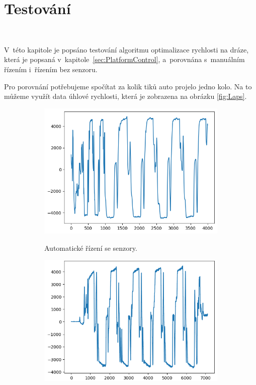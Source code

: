 \chapter{Testování}
\label{sec:Testing}\

V~této kapitole je popsáno testování algoritmu optimalizace rychlosti na dráze,
která je popsaná v~kapitole~\ref{sec:PlatformControl}, a~porovnána s~manuálním
řízením i~řízením bez senzoru.

Pro porovnání potřebujeme spočítat za kolik tiků auto projelo jedno kolo. 
Na to můžeme využít data úhlové rychlosti, která je zobrazena 
na obrázku \ref{fig:Laps}.

\begin{figure}[!h]
    \begin{subfigure}{.5\textwidth}
        \includegraphics[width = \textwidth]{Figures/LapAuto.png}
        \label{fig:LapsAuto}
        \caption{Automatické řízení se senzory.}
    \end{subfigure}
    \begin{subfigure}{.5\textwidth}
        \includegraphics[width = \textwidth]{Figures/LapAutoNoSensors.png}

\end{subfigure}
\end{figure}
